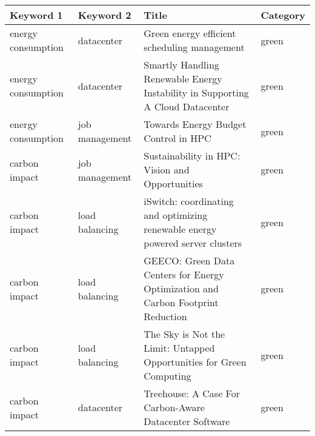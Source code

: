 \newpage
\thispagestyle{plain}
\begin{sidewaystable}
    \begin{tabular}{p{3.5cm}|p{3cm}|p{11cm}|p{1.5cm}}
    Keyword 1          & Keyword 2       & Title                                                                                                                                                                   & Category \\ \hline
    energy consumption & datacenter      & Green energy efficient scheduling management                                                                                                                            & green    \\ \hline
    energy consumption & datacenter      & Smartly Handling Renewable Energy Instability in Supporting A Cloud Datacenter                                                                                          & green    \\ \hline
    energy consumption & job management  & Towards Energy Budget Control in HPC                                                                                                                                    & green    \\ \hline
    carbon impact      & job management  & Sustainability in HPC: Vision and Opportunities                                                                                                                         & green    \\ \hline
    carbon impact      & load balancing  & iSwitch: coordinating and optimizing renewable energy powered server clusters                                                                                           & green    \\ \hline
    carbon impact      & load balancing  & GEECO: Green Data Centers for Energy Optimization and Carbon Footprint Reduction                                                                                        & green    \\ \hline
    carbon impact      & load balancing  & The Sky is Not the Limit: Untapped Opportunities for Green Computing                                                                                                    & green    \\ \hline
    carbon impact      & datacenter      & Treehouse: A Case For Carbon-Aware Datacenter Software                                                                                                                  & green    \\ \hline

\end{tabular}
\end{sidewaystable}
